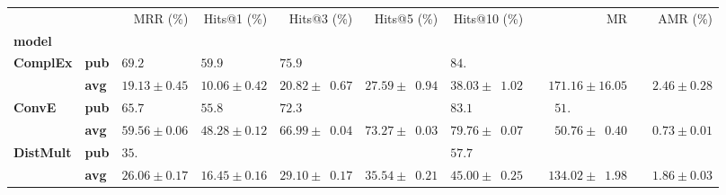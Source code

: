\begin{tabular}{llrrrrrrr}
\toprule
       &     &                    MRR (\%) &                 Hits@1 (\%) &                            Hits@3 (\%) &                            Hits@5 (\%) &                           Hits@10 (\%) &                                        MR &                     AMR (\%) \\
\textbf{model} & {} &                             &                             &                                        &                                        &                                        &                                           &                              \\
\midrule
\textbf{ComplEx} & \textbf{pub} &  $69.2\phantom{0 \pm 0.00}$ &  $59.9\phantom{0 \pm 0.00}$ &            $75.9\phantom{0 \pm 00.00}$ &                                        &            $84.\phantom{00 \pm 00.00}$ &                                           &                              \\
       & \textbf{avg} &            $19.13 \pm 0.45$ &            $10.06 \pm 0.42$ &            $20.82 \pm \phantom{0}0.67$ &            $27.59 \pm \phantom{0}0.94$ &            $38.03 \pm \phantom{0}1.02$ &            $\phantom{00}171.16 \pm 16.05$ &  $\phantom{00}2.46 \pm 0.28$ \\\midrule
\textbf{ConvE} & \textbf{pub} &  $65.7\phantom{0 \pm 0.00}$ &  $55.8\phantom{0 \pm 0.00}$ &            $72.3\phantom{0 \pm 00.00}$ &                                        &            $83.1\phantom{0 \pm 00.00}$ &  $\phantom{000}51.\phantom{00 \pm 00.00}$ &                              \\
       & \textbf{avg} &            $59.56 \pm 0.06$ &            $48.28 \pm 0.12$ &            $66.99 \pm \phantom{0}0.04$ &            $73.27 \pm \phantom{0}0.03$ &            $79.76 \pm \phantom{0}0.07$ &  $\phantom{000}50.76 \pm \phantom{0}0.40$ &  $\phantom{00}0.73 \pm 0.01$ \\\midrule
\textbf{DistMult} & \textbf{pub} &  $35.\phantom{00 \pm 0.00}$ &                             &                                        &                                        &            $57.7\phantom{0 \pm 00.00}$ &                                           &                              \\
       & \textbf{avg} &            $26.06 \pm 0.17$ &            $16.45 \pm 0.16$ &            $29.10 \pm \phantom{0}0.17$ &            $35.54 \pm \phantom{0}0.21$ &            $45.00 \pm \phantom{0}0.25$ &  $\phantom{00}134.02 \pm \phantom{0}1.98$ &  $\phantom{00}1.86 \pm 0.03$ \\\midrule

\end{tabular}
